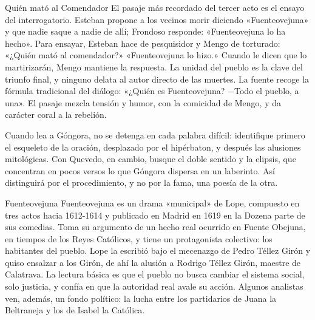 \documentclass{book}
\begin{document}

\begin{tcolorbox}[title={Consejo}, studiumtip, breakable]

Quién mató al Comendador
El pasaje más recordado del tercer acto es el ensayo del interrogatorio. Esteban propone a los vecinos morir diciendo «Fuenteovejuna» y que nadie saque a nadie de allí; Frondoso responde: «Fuenteovejuna lo ha hecho». Para ensayar, Esteban hace de pesquisidor y Mengo de torturado: «¿Quién mató al comendador?» «Fuenteovejuna lo hizo.» Cuando le dicen que lo martirizarán, Mengo mantiene la respuesta. La unidad del pueblo es la clave del triunfo final, y ninguno delata al autor directo de las muertes. La fuente recoge la fórmula tradicional del diálogo: «¿Quién es Fuenteovejuna? \(-\)Todo el pueblo, a una». El pasaje mezcla tensión y humor, con la comicidad de Mengo, y da carácter coral a la rebelión.


Cuando lea a Góngora, no se detenga en cada palabra difícil: identifique primero el esqueleto de la oración, desplazado por el hipérbaton, y después las alusiones mitológicas. Con Quevedo, en cambio, busque el doble sentido y la elipsis, que concentran en pocos versos lo que Góngora dispersa en un laberinto. Así distinguirá por el procedimiento, y no por la fama, una poesía de la otra.

\end{tcolorbox}

\begin{tcolorbox}[title={Definición}, studiumdef, breakable]

Fuenteovejuna
Fuenteovejuna es un drama «municipal» de Lope, compuesto en tres actos hacia 1612-1614 y publicado en Madrid en 1619 en la Dozena parte de sus comedias. Toma su argumento de un hecho real ocurrido en Fuente Obejuna, en tiempos de los Reyes Católicos, y tiene un protagonista colectivo: los habitantes del pueblo. Lope la escribió bajo el mecenazgo de Pedro Téllez Girón y quiso ensalzar a los Girón, de ahí la alusión a Rodrigo Téllez Girón, maestre de Calatrava. La lectura básica es que el pueblo no busca cambiar el sistema social, solo justicia, y confía en que la autoridad real avale su acción. Algunos analistas ven, además, un fondo político: la lucha entre los partidarios de Juana la Beltraneja y los de Isabel la Católica.

\end{tcolorbox}
\end{document}
